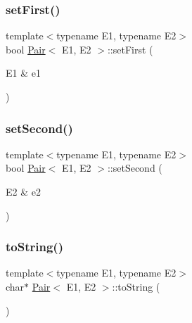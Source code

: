 \mbox{\label{classPair_ae913d817d854f97b7f023ebc57269ef1}} 
\subsubsection{\texorpdfstring{set\+First()}{setFirst()}}
{\footnotesize\ttfamily template$<$typename E1, typename E2$>$ \\
bool \hyperlink{classPair}{Pair}$<$ E1, E2 $>$\+::set\+First (\begin{DoxyParamCaption}\item[{E1 \&}]{e1 }\end{DoxyParamCaption})\hspace{0.3cm}{\ttfamily [inline]}}

\mbox{\label{classPair_aa05202b8aeb2d36872c4d20d01726850}} 
\subsubsection{\texorpdfstring{set\+Second()}{setSecond()}}
{\footnotesize\ttfamily template$<$typename E1, typename E2$>$ \\
bool \hyperlink{classPair}{Pair}$<$ E1, E2 $>$\+::set\+Second (\begin{DoxyParamCaption}\item[{E2 \&}]{e2 }\end{DoxyParamCaption})\hspace{0.3cm}{\ttfamily [inline]}}

\mbox{\label{classPair_a0e0d8500d25e2d3e583866151737f96c}} 
\subsubsection{\texorpdfstring{to\+String()}{toString()}}
{\footnotesize\ttfamily template$<$typename E1, typename E2$>$ \\
char$\ast$ \hyperlink{classPair}{Pair}$<$ E1, E2 $>$\+::to\+String (\begin{DoxyParamCaption}{ }\end{DoxyParamCaption})\hspace{0.3cm}{\ttfamily [inline]}}


